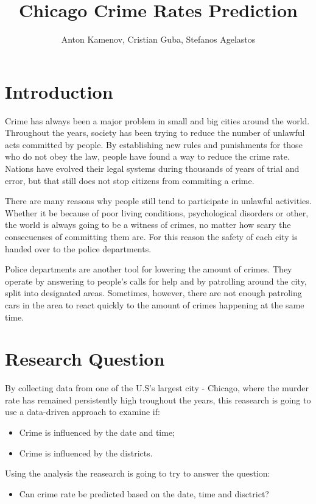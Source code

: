 \documentclass[a4paper, twocolumn]{article}
\author{Anton Kamenov, Cristian Guba, Stefanos Agelastos}
\title{Chicago Crime Rates Prediction}
\begin{document}


\section{Introduction\label{sec:Introduction}}

Crime has always been a major problem in small and big cities around the world.
Throughout the years, society has been trying to reduce the number of unlawful acts committed by people.
By establishing new rules and punishments for those who do not obey the law, people have found a way to reduce the crime rate.
Nations have evolved their legal systems during thousands of years of trial and error, but that still does not stop citizens from commiting a crime.

There are many reasons why people still tend to participate in unlawful activities. 
Whether it be because of poor living conditions, psychological disorders or other, the world is always going to be a witness of crimes, no matter how scary the consecuenses of committing them are.
For this reason the safety of each city is handed over to the police departments.

Police departments are another tool for lowering the amount of crimes.
They operate by answering to people's calls for help and by patrolling around the city, split into designated areas.
Sometimes, however, there are not enough patroling cars in the area to react quickly to the amount of crimes happening at the same time.

\section{Research Question}
By collecting data from one of the U.S's largest city - Chicago,
where the murder rate has remained persistently high troughout the years\cite{friedman2017crime},
this reasearch is going to use a data-driven approach to examine if:
\begin{itemize}
    \item Crime is influenced by the date and time;
    \item Crime is influenced by the districts.
\end{itemize}
Using the analysis the reasearch is going to try to answer the question:
\begin{itemize}
    \item Can crime rate be predicted based on the date, time and disctrict?
\end{itemize}
\end{document}
